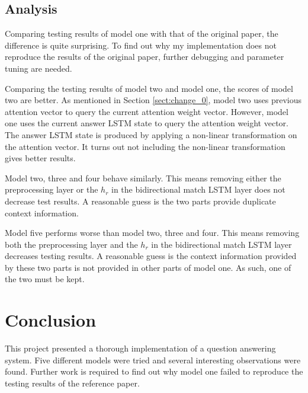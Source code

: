 \documentclass[modernstyle,12pt]{sjsuthesis}
\theoremstyle{definition}
\begin{document}
\section{Analysis}

Comparing testing results of model one with that of the original paper, the difference is quite surprising. To find out why my implementation does not reproduce the results of the original paper, further debugging and parameter tuning are needed.

Comparing the testing results of model two and model one, the scores of model two are better. As mentioned in Section \ref{sect:change_0}, model two uses previous attention vector to query the current attention weight vector. However, model one uses the current answer LSTM state to query the attention weight vector. The answer LSTM state is produced by applying a non-linear transformation on the attention vector. It turns out not including the non-linear transformation gives better results.

Model two, three and four behave similarly. This means removing either the preprocessing layer or the $h_r$ in the bidirectional match LSTM layer does not decrease test results. A reasonable guess is the two parts provide duplicate context information.

Model five performs worse than model two, three and four. This means removing both the preprocessing layer and the $h_r$ in the bidirectional match LSTM layer decreases testing results. A reasonable guess is the context information provided by these two parts is not provided in other parts of model one. As such, one of the two must be kept.





\chapter{Conclusion}

This project presented a thorough implementation of a question answering system. Five different models were tried and several interesting observations were found. Further work is required to find out why model one failed to reproduce the testing results of the reference paper.




%
%
%
\end{document}
